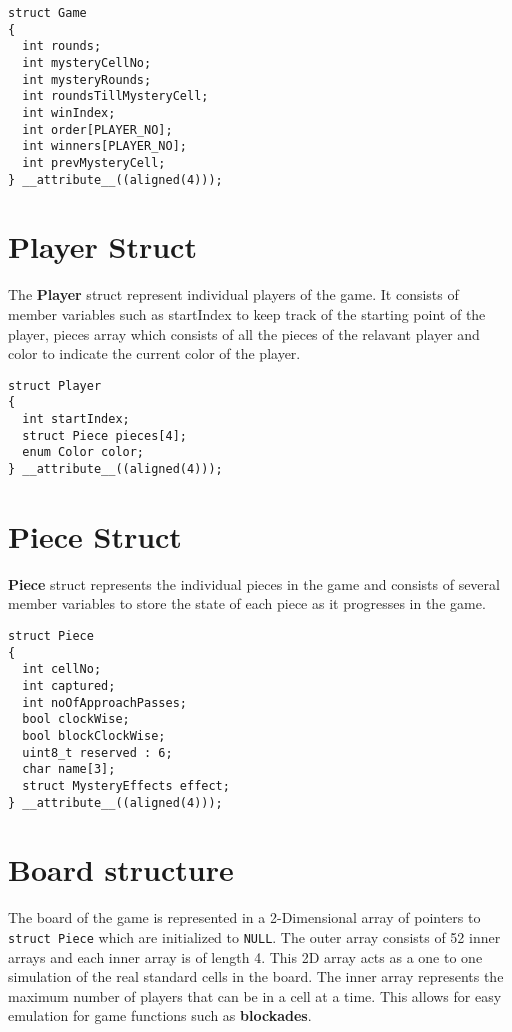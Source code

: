\documentclass[12pt, a4paper]{report}
\begin{document}
\begin{lstlisting}
struct Game
{
  int rounds;
  int mysteryCellNo;
  int mysteryRounds;
  int roundsTillMysteryCell;
  int winIndex;
  int order[PLAYER_NO];
  int winners[PLAYER_NO];
  int prevMysteryCell;
} __attribute__((aligned(4)));
\end{lstlisting}

\section{Player Struct}
The \textbf{Player} struct represent individual players of the game. It consists of member variables such as startIndex to keep track of the starting point of the player, pieces array which consists of all the pieces of the relavant player and color to indicate the current color of the player.

\begin{lstlisting}
struct Player
{
  int startIndex;
  struct Piece pieces[4];
  enum Color color;
} __attribute__((aligned(4)));
\end{lstlisting}

\section{Piece Struct}
\textbf{Piece} struct represents the individual pieces in the game and consists of several member variables to store the state of each piece as it progresses in the game.

\begin{lstlisting}
struct Piece
{
  int cellNo;
  int captured;
  int noOfApproachPasses;
  bool clockWise;
  bool blockClockWise;
  uint8_t reserved : 6; 
  char name[3];
  struct MysteryEffects effect;
} __attribute__((aligned(4)));
\end{lstlisting}

\section{Board structure}
The board of the game is represented in a 2-Dimensional array of pointers to \lstinline|struct Piece| which are initialized to \lstinline|NULL|. The outer array consists of 52 inner arrays and each inner array is of length 4. This 2D array acts as a one to one simulation of the real standard cells in the board. The inner array represents the maximum number of players that can be in a cell at a time. This allows for easy emulation for game functions such as \textbf{blockades}. 
\end{document}

